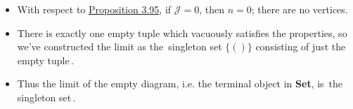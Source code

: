 \begin{itemize}
    \item  With respect to \href{doc/1 math/Seven Sketches in Compositionality/Chapter 3: Databases/5 Introduction to limits and colimits/3 Finite limits in Set/1 Limit formula}{Proposition 3.95}, if $\mathcal{J}=0$, then $n=0$; there are no vertices.
    \item There is exactly one empty tuple which vacuously satisfies the properties, so we've constructed the limit as the \,singleton set $\{()\}$ consisting of just the empty tuple\,.
    \item Thus the limit of the empty diagram, i.e. the terminal object in \textbf{Set}, is \,the singleton set\,.

  \end{itemize}